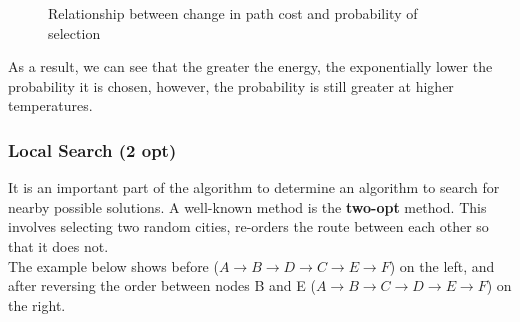 \documentclass{article}
\begin{document}
\begin{figure}[H]
    \centering
    \caption{Relationship between change in path cost and probability of selection}
\end{figure}

As a result, we can see that the greater the energy, the exponentially lower the probability it is chosen, however, the probability is still greater at higher temperatures.
\\

\subsubsection{Local Search (2 opt)}

It is an important part of the algorithm to determine an algorithm to search for nearby possible solutions.
A well-known method is the \textbf{two-opt} method.
This involves selecting two random cities, re-orders the route between each other so that it does not.
\\

The example below shows before ($A \rightarrow B \rightarrow D \rightarrow C \rightarrow E \rightarrow F$) on the left, and after reversing the order between nodes B and E ($A \rightarrow B \rightarrow C \rightarrow D \rightarrow E \rightarrow F$) on the right.
\end{document}
